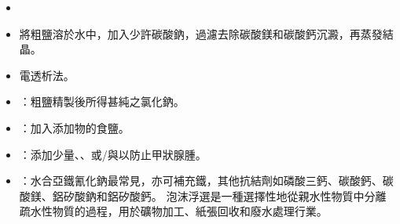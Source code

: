 \documentclass[a4paper,12pt]{report}
\begin{document}
\begin{itemize}
\begin{itemize}
\subsubsection{水泥的製造}
\begin{enumerate}
\item 煅燒灰石：
\[\ce{CaCO3(s) -> CaO(s) + CO2(g)}\]
\item 石灰與黏土、火山灰、爐渣等共熱至約1500°C，製造出各種不同的水泥：
\[\ce{CaO(s) + SiO2(s) -> CaSiO3(s)}\]
\[\ce{2CaO(s) + SiO2(s) -> 2CaO$\cdot$SiO2(s)}\]
\[\ce{3CaO(s) + SiO2(s) -> 3CaO$\cdot$SiO2(s)}\]
\[\ce{3CaO(s) + Al2O3(s) -> 3CaO$\cdot$Al2O3(s)}\]
\[\ce{4CaO(s) + Al2O3(s) + Fe2O3(s) -> 4CaO$\cdot$Al2O3$\cdot$Fe2O3(s)}\]
\end{enumerate}
指水泥遇水逐漸變硬的化學過程，放熱，水泥與水混合後可任意塑型，經一段時間後逐漸發生水化作用變硬，故為常用建築材料。
\begin{itemize}
\item 矽酸三鈣的水化反應：主要產生早期強度。
\[\ce{2(3CaO$\cdot$SiO2) + 6H2O -> 3CaO$\cdot 2$SiO2$\cdot 3$H2O + 3Ca(OH)2}\]
\item 矽酸二鈣的水化反應：貢獻長期強度。
\[\ce{2(2CaO$\cdot$SiO2) + 4H2O -> 3CaO$\cdot 2$SiO2$\cdot 3$H2O + Ca(OH)2}\]
\end{itemize}
將純度較高的溶於硫酸，製得磷酸與副產品石膏，均為非食品級：
\[\ce{Ca5(PO4)3(F,Cl,OH)(s) + 5H2SO4(aq) -> 5CaSO4(aq) + 3H3PO4(aq) + H(F,Cl)(aq)\tx{/}H2O(l)}\]
將海水或鹽湖水截留於鹽田以太陽曝晒使水蒸發，相當節省能源，硫酸鈣首先析出，接著是氯化鈉，收集該等固體即為，主要成分為氯化鈉，次要成分為氯化鈣、氯化鎂、硫酸鈣、硫酸鎂等，易潮解且帶苦味；剩餘的水溶液稱，其中陰離子如氯、溴、碘、硫酸根，陽離子如鎂、鈉、鉀、鈣，食品級者可加入豆漿使膠體粒子凝析，形成豆腐、豆花。
\bit
\item {}
\bit
\item 將粗鹽溶於水中，加入少許碳酸鈉，過濾去除碳酸鎂和碳酸鈣沉澱，再蒸發結晶。
\item 電透析法。
\eit
\item {}：粗鹽精製後所得甚純之氯化鈉。
\item {}：加入添加物的食鹽。
\item {}：添加少量、、或/與以防止甲狀腺腫。
\item {}：水合亞鐵氰化鈉最常見，亦可補充鐵，其他抗結劑如磷酸三鈣、碳酸鈣、碳酸鎂、鋁矽酸鈉和鋁矽酸鈣。
\eit
{}
泡沫浮選是一種選擇性地從親水性物質中分離疏水性物質的過程，用於礦物加工、紙張回收和廢水處理行業。


\end{itemize}
\end{itemize}
\end{document}
